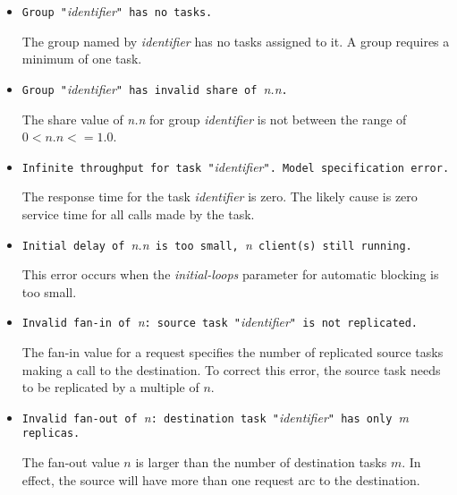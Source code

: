 \begin{itemize}
\item \texttt{Group "}\emph{identifier}\texttt{" has no tasks.}
  
  The group named by \emph{identifier} has no tasks assigned to it.  A group requires a minimum of one task.

\item \texttt{Group "}\emph{identifier}\texttt{" has invalid share of }\emph{n.n}\texttt{.}

  The share value of \emph{n.n} for group \emph{identifier} is not between the range of $
  0 < n.n <= 1.0$.

\item \texttt{Infinite throughput for task
    "}\emph{identifier}\texttt{".  Model specification
    error.}
  
  The response time for the task
  \emph{identifier} is zero.  The
  likely cause is zero service time for all calls made by the task.

\item \texttt{Initial delay of }\emph{n.n}\texttt{ is too small,
  }\emph{n}\texttt{ client(s) still running.}
  
  This error occurs when the \emph{initial-loops}
  parameter for automatic
  blocking is too
  small.

\item \texttt{Invalid fan-in of }\emph{n}\texttt{: source task
    "}\emph{identifier}\texttt{" is not replicated.}
  
  The fan-in value for a request specifies the
  number of replicated source tasks making a
  call to the destination.  To correct this error, the source task
  needs to be replicated by a multiple of $n$.

\item \texttt{Invalid fan-out of }\emph{n}\texttt{: destination task
    "}\emph{identifier}\texttt{" has only }\emph{m}\texttt{
    replicas.}
  
  The fan-out value $n$ is larger than the number
  of destination tasks $m$.  In effect, the source will have more than
  one request arc to the destination.


\end{itemize}
